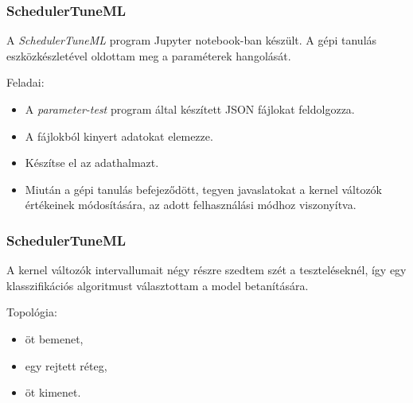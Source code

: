 \documentclass{beamer}
\begin{document}
\begin{frame}
\frametitle{SchedulerTuneML}
A \textit{SchedulerTuneML} program Jupyter notebook-ban készült. A gépi tanulás eszközkészletével oldottam meg a paraméterek hangolását.

\bigskip

Feladai:
\begin{itemize}
\item A \textit{parameter-test} program által készített JSON fájlokat feldolgozza.
\item A fájlokból kinyert adatokat elemezze.
\item Készítse el az adathalmazt.
\item Miután a gépi tanulás befejeződött, tegyen javaslatokat a kernel változók értékeinek módosítására, az adott felhasználási módhoz viszonyítva.
\end{itemize}   

\end{frame}


\begin{frame}
\frametitle{SchedulerTuneML}

A kernel változók intervallumait négy részre szedtem szét a teszteléseknél, így egy klasszifikációs algoritmust választottam a model betanítására.

\bigskip

Topológia:
\begin{itemize}
	\item öt bemenet,
	\item egy rejtett réteg,
	\item öt kimenet.
\end{itemize}


\end{frame}
\end{document}
